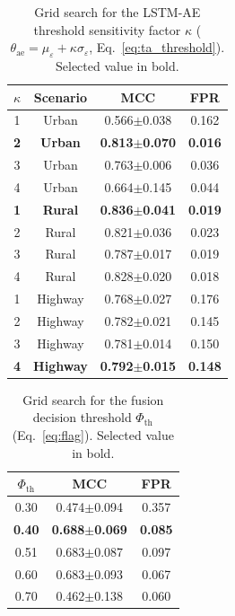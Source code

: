 \documentclass[12pt, a4paper]{report}
\begin{document}
\begin{table}[H]
\centering
\caption{Grid search for the LSTM-AE threshold sensitivity factor
$\kappa$ ($\theta_{\mathrm{ae}}=\mu_\varepsilon+\kappa\sigma_\varepsilon$,
Eq.~\ref{eq:ta_threshold}). Selected value in bold.}
\label{tab:kappa-sensitivity}
\renewcommand{\arraystretch}{1.2}
\begin{tabular}{|c|c|c|c|}
\hline
\textbf{$\kappa$} & \textbf{Scenario} & \textbf{MCC} & \textbf{FPR} \\
\hline
1 & Urban & 0.566$\pm$0.038 & 0.162 \\
\hline
\textbf{2} & \textbf{Urban} & \textbf{0.813$\pm$0.070} & \textbf{0.016} \\
\hline
3 & Urban & 0.763$\pm$0.006 & 0.036 \\
\hline
4 & Urban & 0.664$\pm$0.145 & 0.044 \\
\hline
\textbf{1} & \textbf{Rural} & \textbf{0.836$\pm$0.041} & \textbf{0.019} \\
\hline
2 & Rural & 0.821$\pm$0.036 & 0.023 \\
\hline
3 & Rural & 0.787$\pm$0.017 & 0.019 \\
\hline
4 & Rural & 0.828$\pm$0.020 & 0.018 \\
\hline
1 & Highway & 0.768$\pm$0.027 & 0.176 \\
\hline
2 & Highway & 0.782$\pm$0.021 & 0.145 \\
\hline
3 & Highway & 0.781$\pm$0.014 & 0.150 \\
\hline
\textbf{4} & \textbf{Highway} & \textbf{0.792$\pm$0.015} & \textbf{0.148} \\
\hline
\end{tabular}
\end{table}


\begin{table}[H]
\centering
\caption{Grid search for the fusion decision threshold
$\Phi_{\mathrm{th}}$ (Eq.~\ref{eq:flag}). Selected value in bold.}
\label{tab:phith-sensitivity}
\renewcommand{\arraystretch}{1.2}
\begin{tabular}{|c|c|c|}
\hline
\textbf{$\Phi_{\mathrm{th}}$} & \textbf{MCC} & \textbf{FPR} \\
\hline
0.30            & 0.474$\pm$0.094 & 0.357 \\
\hline
\textbf{0.40}   & \textbf{0.688$\pm$0.069} & \textbf{0.085} \\
\hline
0.51            & 0.683$\pm$0.087 & 0.097 \\
\hline
0.60            & 0.683$\pm$0.093 & 0.067 \\
\hline
0.70            & 0.462$\pm$0.138 & 0.060 \\
\hline
\end{tabular}
\end{table}
\end{document}
